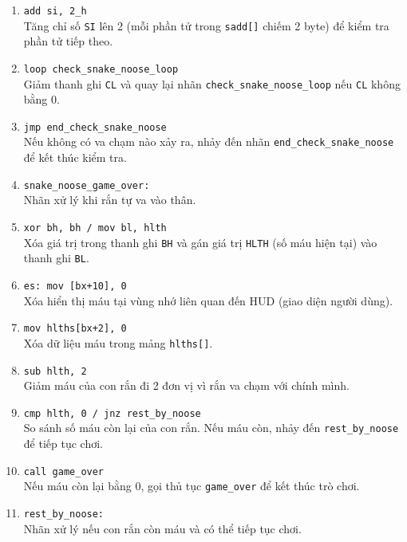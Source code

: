 \documentclass[12pt]{article}
\begin{document}
\begin{enumerate}[label=\textbf{\arabic*.}]
    \item \texttt{add si, 2\_h} \\
    Tăng chỉ số \texttt{SI} lên 2 (mỗi phần tử trong \texttt{sadd[]} chiếm 2 byte) để kiểm tra phần tử tiếp theo.

    \item \texttt{loop check\_snake\_noose\_loop} \\
    Giảm thanh ghi \texttt{CL} và quay lại nhãn \texttt{check\_snake\_noose\_loop} nếu \texttt{CL} không bằng 0.

    \item \texttt{jmp end\_check\_snake\_noose} \\
    Nếu không có va chạm nào xảy ra, nhảy đến nhãn \texttt{end\_check\_snake\_noose} để kết thúc kiểm tra.

    \item \texttt{snake\_noose\_game\_over:} \\
    Nhãn xử lý khi rắn tự va vào thân.

    \item \texttt{xor bh, bh / mov bl, hlth} \\
    Xóa giá trị trong thanh ghi \texttt{BH} và gán giá trị \texttt{HLTH} (số máu hiện tại) vào thanh ghi \texttt{BL}.

    \item \texttt{es: mov [bx+10], 0} \\
    Xóa hiển thị máu tại vùng nhớ liên quan đến HUD (giao diện người dùng).

    \item \texttt{mov hlths[bx+2], 0} \\
    Xóa dữ liệu máu trong mảng \texttt{hlths[]}.

    \item \texttt{sub hlth, 2} \\
    Giảm máu của con rắn đi 2 đơn vị vì rắn va chạm với chính mình.

    \item \texttt{cmp hlth, 0 / jnz rest\_by\_noose} \\
    So sánh số máu còn lại của con rắn. Nếu máu còn, nhảy đến \texttt{rest\_by\_noose} để tiếp tục chơi.

    \item \texttt{call game\_over} \\
    Nếu máu còn lại bằng 0, gọi thủ tục \texttt{game\_over} để kết thúc trò chơi.

    \item \texttt{rest\_by\_noose:} \\
    Nhãn xử lý nếu con rắn còn máu và có thể tiếp tục chơi.


\end{enumerate}
\end{document}

